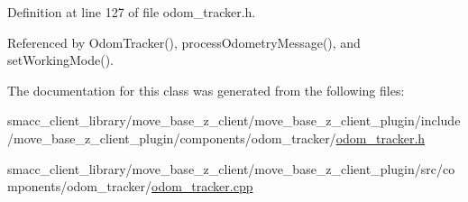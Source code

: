 Definition at line 127 of file odom\+\_\+tracker.\+h.



Referenced by Odom\+Tracker(), process\+Odometry\+Message(), and set\+Working\+Mode().



The documentation for this class was generated from the following files\+:\begin{DoxyCompactItemize}
\item 
smacc\+\_\+client\+\_\+library/move\+\_\+base\+\_\+z\+\_\+client/move\+\_\+base\+\_\+z\+\_\+client\+\_\+plugin/include/move\+\_\+base\+\_\+z\+\_\+client\+\_\+plugin/components/odom\+\_\+tracker/\hyperlink{odom__tracker_8h}{odom\+\_\+tracker.\+h}\item 
smacc\+\_\+client\+\_\+library/move\+\_\+base\+\_\+z\+\_\+client/move\+\_\+base\+\_\+z\+\_\+client\+\_\+plugin/src/components/odom\+\_\+tracker/\hyperlink{odom__tracker_8cpp}{odom\+\_\+tracker.\+cpp}\end{DoxyCompactItemize}
